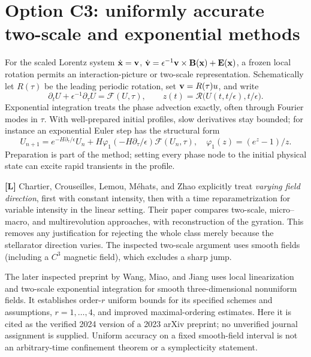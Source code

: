 \documentclass[10pt,a4paper]{article}
\newcommand{\B}{\mathbf B}\newcommand{\bunit}{\mathbf b}
\newcommand{\lit}{\textbf{[L]}}
\begin{document}
\section{Option C3: uniformly accurate two-scale and exponential methods}
\label{sec:ua}
For the scaled Lorentz system $\dot{\mathbf x}=\mathbf v$, $\dot\v=\epsilon^{-1}\v\times\B(\x)+\mathbf E(\x)$, a frozen local rotation permits an interaction-picture or two-scale representation. Schematically let $R(\tau)$ be the leading periodic rotation, set $\mathbf v=R(\tau)u$, and write
\begin{equation}\label{eq:twoscale}
 \partial_t U+\epsilon^{-1}\partial_\tau U=\mathcal F(U,\tau),
 \qquad z(t)=\mathcal R\bigl(U(t,t/\epsilon),t/\epsilon\bigr).
\end{equation}
Exponential integration treats the phase advection exactly, often through Fourier modes in $\tau$. With well-prepared initial profiles, slow derivatives stay bounded; for instance an exponential Euler step has the structural form
\begin{equation}
 U_{n+1}=e^{-H\partial_\tau/\epsilon}U_n
      +H\varphi_1(-H\partial_\tau/\epsilon)\mathcal F(U_n,\tau),
 \quad\varphi_1(z)=(e^z-1)/z.
\end{equation}
Preparation is part of the method; setting every phase node to the initial physical state can excite rapid transients in the profile.

\lit{} Chartier, Crouseilles, Lemou, M\'ehats, and Zhao \cite{ua3d} explicitly treat \emph{varying field direction}, first with constant intensity, then with a time reparametrization for variable intensity in the linear setting. Their paper compares two-scale, micro--macro, and multirevolution approaches, with reconstruction of the gyration. This removes any justification for rejecting the whole class merely because the stellarator direction varies. The inspected two-scale argument uses smooth fields (including a $C^3$ magnetic field), which excludes a sharp jump.

The later inspected preprint by Wang, Miao, and Jiang \cite{twoexp} uses local linearization and two-scale exponential integration for smooth three-dimensional nonuniform fields. It establishes order-$r$ uniform bounds for its specified schemes and assumptions, $r=1,\ldots,4$, and improved maximal-ordering estimates. Here it is cited as the verified 2024 version of a 2023 arXiv preprint; no unverified journal assignment is supplied. Uniform accuracy on a fixed smooth-field interval is not an arbitrary-time confinement theorem or a symplecticity statement.
\end{document}

